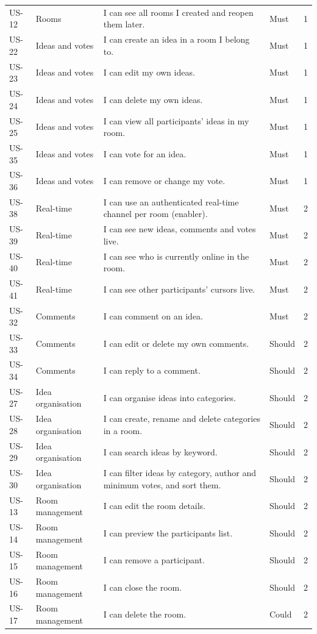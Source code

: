\documentclass[12pt,a4paper]{report}
\begin{document}
\begin{longtable}{@{}p{}p{}p{}p{}p{}@{}}
US-12 & Rooms & I can see all rooms I created and reopen them later. & Must & 1 \\
US-22 & Ideas and votes & I can create an idea in a room I belong to. & Must & 1 \\
US-23 & Ideas and votes & I can edit my own ideas. & Must & 1 \\
US-24 & Ideas and votes & I can delete my own ideas. & Must & 1 \\
US-25 & Ideas and votes & I can view all participants' ideas in my room. & Must & 1 \\
US-35 & Ideas and votes & I can vote for an idea. & Must & 1 \\
US-36 & Ideas and votes & I can remove or change my vote. & Must & 1 \\
US-38 & Real-time & I can use an authenticated real-time channel per room (enabler). & Must & 2 \\
US-39 & Real-time & I can see new ideas, comments and votes live. & Must & 2 \\
US-40 & Real-time & I can see who is currently online in the room. & Must & 2 \\
US-41 & Real-time & I can see other participants' cursors live. & Must & 2 \\
US-32 & Comments & I can comment on an idea. & Must & 2 \\
US-33 & Comments & I can edit or delete my own comments. & Should & 2 \\
US-34 & Comments & I can reply to a comment. & Should & 2 \\
US-27 & Idea organisation & I can organise ideas into categories. & Should & 2 \\
US-28 & Idea organisation & I can create, rename and delete categories in a room. & Should & 2 \\
US-29 & Idea organisation & I can search ideas by keyword. & Should & 2 \\
US-30 & Idea organisation & I can filter ideas by category, author and minimum votes, and sort them. & Should & 2 \\
US-13 & Room management & I can edit the room details. & Should & 2 \\
US-14 & Room management & I can preview the participants list. & Should & 2 \\
US-15 & Room management & I can remove a participant. & Should & 2 \\
US-16 & Room management & I can close the room. & Should & 2 \\
US-17 & Room management & I can delete the room. & Could & 2 \\

\end{longtable}
\end{document}
